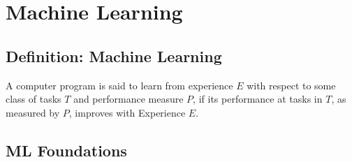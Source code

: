 

\section{Machine Learning}%
\label{ml:sec:machine_learning}

\subsection{Definition: Machine Learning}%
\label{ml:sub:definition_machine_learning}
A computer program is said to learn from experience \(E\) with respect to some class of tasks \(T\)
and performance measure \(P\), if its performance at tasks in \(T\), as measured by \(P\), improves with
Experience \(E\).

\subsection{ML Foundations}%
\label{ml:sub:ml_foundations}

